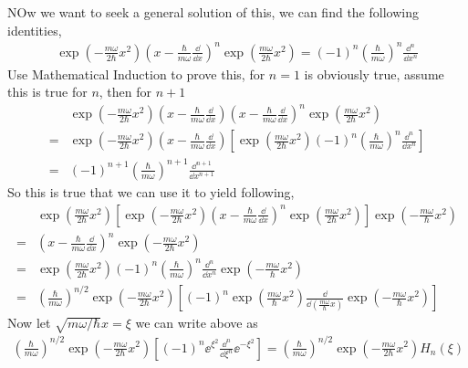 NOw we want to seek a general solution of this, we can find the following identities,
\begin{eqnarray}
    \exp\left(- \frac{m \omega}{2 \hbar}x^2\right) \left(x - \frac{\hbar}{m \omega} \frac{\dd}{\dd x}\right)^n \exp\left( \frac{m \omega}{2 \hbar}x^2\right) = (-1)^n \left( \frac{\hbar}{m \omega} \right)^n \frac{\dd^n}{\dd x^n}
\end{eqnarray} 
Use Mathematical Induction to prove this, for $n=1$ is obviously true, assume this is true for $n$, then for $n+1$ 
\begin{align}
    &\exp\left(- \frac{m \omega}{2 \hbar}x^2\right) \left(x - \frac{\hbar}{m \omega} \frac{\dd}{\dd x}\right) \left(x - \frac{\hbar}{m \omega} \frac{\dd}{\dd x}\right)^n \exp\left( \frac{m \omega}{2 \hbar}x^2\right) \\
    =& \exp\left(- \frac{m \omega}{2 \hbar}x^2\right) \left(x - \frac{\hbar}{m \omega} \frac{\dd}{\dd x}\right) \left[ \exp\left( \frac{m \omega}{2 \hbar}x^2\right) (-1)^n \left( \frac{\hbar}{m \omega} \right)^n \frac{\dd^n}{\dd x^n} \right] \\
    =& (-1)^{n+1} \left( \frac{\hbar}{m \omega} \right)^{n+1} \frac{\dd^{n+1}}{\dd x^{n+1}} 
\end{align}
So this is true that we can use it to yield following,
\begin{align}
    &\exp\left( \frac{m \omega}{2 \hbar}x^2\right)\left[\exp\left(-\frac{m \omega}{2 \hbar}x^2\right)\left(x - \frac{\hbar}{m \omega} \frac{\dd}{\dd x}\right)^n \exp\left( \frac{m \omega}{2 \hbar}x^2\right)\right]\exp\left(-\frac{m \omega}{ \hbar}x^2\right) \\
    =& \left(x - \frac{\hbar}{m \omega} \frac{\dd}{\dd x}\right)^n \exp\left(- \frac{m \omega}{2 \hbar}x^2\right) \\
    =& \exp\left( \frac{m \omega}{2 \hbar}x^2\right) (-1)^n \left( \frac{\hbar}{m \omega} \right)^n \frac{\dd^n}{\dd x^n} \exp\left(-\frac{m \omega}{ \hbar}x^2\right) \\
    =& \left( \frac{\hbar}{m \omega} \right)^{n/2} \exp\left(-\frac{m \omega}{2 \hbar}x^2\right) \left[ (-1)^n \exp\left(\frac{m \omega}{ \hbar}x^2\right) \frac{\dd}{\dd \left(\frac{m \omega}{\hbar}x\right)} \exp\left( - \frac{m \omega}{ \hbar}x^2\right) \right] 
\end{align}
Now let $\sqrt{m \omega/\hbar}x = \xi$ we can write above as 
\begin{eqnarray}
    \left( \frac{\hbar}{m \omega} \right)^{n/2} \exp\left(-\frac{m \omega}{2 \hbar}x^2\right) \left[ (-1)^n \ee^ {\xi^2} \frac{\dd^n}{\dd \xi^n} \ee^{-\xi^2} \right] = \left( \frac{\hbar}{m \omega} \right)^{n/2} \exp\left(-\frac{m \omega}{2 \hbar}x^2\right) H_n(\xi)
\end{eqnarray}
